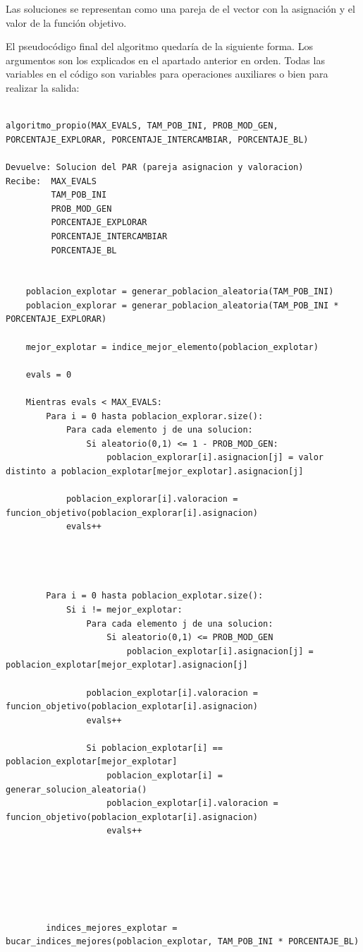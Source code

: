 \documentclass[12pt, spanish]{article}
\begin{document}
Las soluciones se representan como una pareja de el vector con la asignación y el valor de la función objetivo.

El pseudocódigo final del algoritmo quedaría de la siguiente forma. Los argumentos son los explicados en el apartado anterior en orden. Todas las variables en el código son variables para operaciones auxiliares o bien para realizar la salida:

\begin{lstlisting}

algoritmo_propio(MAX_EVALS, TAM_POB_INI, PROB_MOD_GEN, PORCENTAJE_EXPLORAR, PORCENTAJE_INTERCAMBIAR, PORCENTAJE_BL)

Devuelve: Solucion del PAR (pareja asignacion y valoracion)
Recibe:  MAX_EVALS
		 TAM_POB_INI
		 PROB_MOD_GEN
		 PORCENTAJE_EXPLORAR
		 PORCENTAJE_INTERCAMBIAR
		 PORCENTAJE_BL
		 
		 
	poblacion_explotar = generar_poblacion_aleatoria(TAM_POB_INI)
	poblacion_explorar = generar_poblacion_aleatoria(TAM_POB_INI * PORCENTAJE_EXPLORAR)
	
	mejor_explotar = indice_mejor_elemento(poblacion_explotar)
	
	evals = 0
	
	Mientras evals < MAX_EVALS:
		Para i = 0 hasta poblacion_explorar.size():
			Para cada elemento j de una solucion:
				Si aleatorio(0,1) <= 1 - PROB_MOD_GEN:
					poblacion_explorar[i].asignacion[j] = valor distinto a poblacion_explotar[mejor_explotar].asignacion[j]
					
			poblacion_explorar[i].valoracion = funcion_objetivo(poblacion_explorar[i].asignacion)
			evals++
		
		
		
		
		Para i = 0 hasta poblacion_explotar.size():
			Si i != mejor_explotar:
				Para cada elemento j de una solucion:
					Si aleatorio(0,1) <= PROB_MOD_GEN
						poblacion_explotar[i].asignacion[j] = poblacion_explotar[mejor_explotar].asignacion[j]
						
				poblacion_explotar[i].valoracion = funcion_objetivo(poblacion_explotar[i].asignacion)
				evals++

				Si poblacion_explotar[i] == poblacion_explotar[mejor_explotar]
					poblacion_explotar[i] = generar_solucion_aleatoria()
					poblacion_explotar[i].valoracion = funcion_objetivo(poblacion_explotar[i].asignacion)
					evals++
					
					
				
				
			
			
		indices_mejores_explotar = bucar_indices_mejores(poblacion_explotar, TAM_POB_INI * PORCENTAJE_BL)
		

\end{lstlisting}
\end{document}
